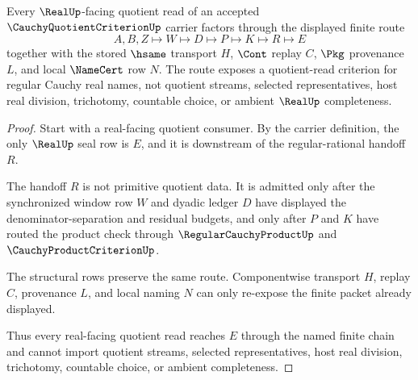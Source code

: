 \begin{theorem}
\label{thm:cauchy-quotient-criterion-real-seal-boundary}
Every $\RealUp$-facing quotient read of an accepted $\CauchyQuotientCriterionUp$ carrier factors through the displayed finite route
$$
A,B,Z\longmapsto W\longmapsto D\longmapsto P\longmapsto K\longmapsto R\longmapsto E
$$
together with the stored $\hsame$ transport $H$, $\Cont$ replay $C$, $\Pkg$ provenance $L$, and local $\NameCert$ row $N$. The route exposes a quotient-read criterion for regular Cauchy real names, not quotient streams, selected representatives, host real division, trichotomy, countable choice, or ambient $\RealUp$ completeness.
\end{theorem}
\begin{proof}
Start with a real-facing quotient consumer. By the carrier definition, the only $\RealUp$ seal row is $E$, and it is downstream of the regular-rational handoff $R$.

The handoff $R$ is not primitive quotient data. It is admitted only after the synchronized window row $W$ and dyadic ledger $D$ have displayed the denominator-separation and residual budgets, and only after $P$ and $K$ have routed the product check through $\RegularCauchyProductUp$ and $\CauchyProductCriterionUp$.

The structural rows preserve the same route. Componentwise transport $H$, replay $C$, provenance $L$, and local naming $N$ can only re-expose the finite packet already displayed.

Thus every real-facing quotient read reaches $E$ through the named finite chain and cannot import quotient streams, selected representatives, host real division, trichotomy, countable choice, or ambient completeness.
\end{proof}


